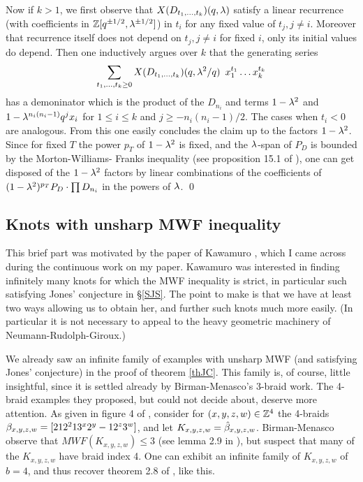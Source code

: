 Now if $k>1$, we first observe that $X(D_{t_1,\dots,t_k})(q,\lambda)$
satisfy a linear recurrence (with coefficients in ${\Bbb Z}[
q^{\pm 1/2},\lambda^{\pm 1/2}]$) in $t_i$ for any fixed value
of $t_j, j\ne i$. Moreover that recurrence itself does not
depend on $t_j, j\ne i$ for fixed $i$, only its initial values
do depend. Then one inductively argues over $k$ that the
generating series 
\[
\sum_{t_1,\dots,t_k\ge 0} X(D_{t_1,\dots,t_k})(q,\lambda^2/q)\enspace
x_1^{t_1} \dots x_k^{t_k}
\]
has a demoninator which is the product of the $D_{n_i}$ and terms
$1-\lambda^2$ and $1-\lambda^{n_i(n_i-1)}q^{j}x_i$ for $1\le i\le k$ and $j\ge 
-n_i(n_i-1)/2$. The cases when $t_i<0$ are analogous. From this
one easily concludes the claim up to the factors $1-\lambda^2$.
Since for fixed $T$ the power $p_T$ of $1-\lambda^2$ is fixed,
and the $\lambda$-span of $P_D$ is bounded by the Morton-Williams-%
Franks inequality (see proposition 15.1 of \cite{Jones}),
one can get disposed of the $1-\lambda^2$
factors by linear combinations of the coefficients of
$(1-\lambda^2)^{p_T}P_D\cdot \prod D_{n_i}$ in the powers
of $\lambda$. \qed


\subsection{Knots with unsharp MWF inequality}

This brief part was motivated by the paper of Kawamuro
\cite{Kawamuro}, which I came across during the continuous work
on my paper. Kawamuro was interested in finding infinitely many
knots for which the MWF inequality is strict, in particular such
satisfying Jones' conjecture in \S\ref{SJS}. The point to make
is that we have at least two ways allowing us to obtain her, and
further such knots much more easily. (In particular it is not
necessary to appeal to the heavy geometric machinery of
Neumann-Rudolph-Giroux.)

We already saw an infinite family of examples with unsharp MWF
(and satisfying Jones' conjecture) in the proof of theorem
\ref{thJC}. This family is, of course, little insightful,
since it is settled already by Birman-Menasco's 3-braid
work. The 4-braid examples they proposed, but could not
decide about, deserve more attention. As given in figure 4
of \cite{Kawamuro}, consider for $(x,y,z,w)\in{\Bbb Z}^4$ the
4-braids $\beta_{x,y,z,w}=[212^213^x2^y-12^z3^w]$, and let
$K_{x,y,z,w}=\hat{\beta}_{x,y,z,w}$. Birman-Menasco observe that
$MWF(K_{x,y,z,w})\le 3$ (see lemma 2.9 in \cite{Kawamuro}),
but suspect that many of the $K_{x,y,z,w}$ have braid index 4.
One can exhibit an infinite family of $K_{x,y,z,w}$ of $b=4$,
and thus recover theorem 2.8 of \cite{Kawamuro}, like this.

